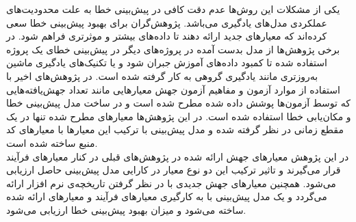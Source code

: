   یکی از مشکلات این روش‌ها عدم دقت کافی در پیش‌بینی خطا به علت محدودیت‌های عملکردی مدل‌های یادگیری می‌باشد. پژوهش‌گران برای بهبود پیش‌بینی خطا سعی کرده‌اند که معیارهای جدید ارائه دهند تا داده‌های بیشتر و موثرتری فراهم شود. در برخی پژوهش‌ها از مدل بدست آمده در پروژه‌های دیگر در پیش‌بینی خطای یک پروژه استفاده شده تا کمبود داده‌های آموزش جبران شود و یا تکنیک‌های یادگیری ماشین به‌روزتری مانند یادگیری گروهی به کار گرفته شده است. در پژوهش‌های اخیر  با استفاده از موارد آزمون و مفاهیم آزمون جهش معیارهایی مانند تعداد جهش‌یافته‌هایی که توسط آزمون‌ها پوشش داده شده مطرح  شده است و در ساخت مدل پیش‌بینی خطا \cite{bowes2016mutation} و مکان‌یابی خطا  \cite {papadakis2015metallaxis}استفاده شده است. در این پژوهش‌ها معیارهای مطرح شده تنها در یک مقطع زمانی در نظر گرفته شده و مدل پیش‌بینی با ترکیب این معیارها با معیارهای کد منبع ساخته شده است.\\
  
 در این پژوهش معیارهای جهش ارائه شده در پژوهش‌های قبلی در کنار معیارهای فرآیند قرار می‌گیرند و تاثیر ترکیب این دو نوع  معیار در کارایی مدل پیش‌بینی حاصل ارزیابی می‌شود. همچنین معیارهای جهش جدیدی با در نظر گرفتن تاریخچه‌ی نرم افزار ارائه می‌گردد و یک مدل پیش‌بینی با به کارگیری معیارهای فرآیند و معیارهای ارائه شده ساخته می‌شود و میزان بهبود پیش‌بینی خطا ارزیابی می‌شود.  
